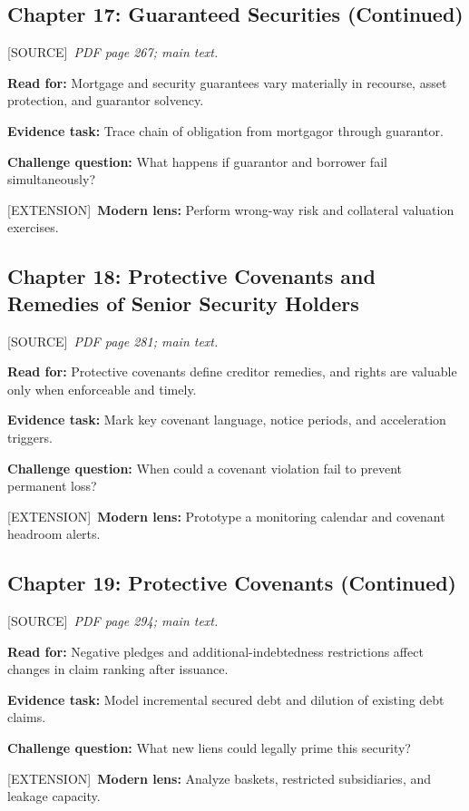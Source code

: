 \documentclass[11pt,letterpaper]{article}
\newcommand{\src}{\textsf{\color{sea}[SOURCE]}}
\newcommand{\ext}{\textsf{\color{gold}[EXTENSION]}}
\begin{document}
\subsection{Chapter 17: Guaranteed Securities (Continued)}
\src\ \textit{PDF page 267; main text.}\par
\textbf{Read for:} Mortgage and security guarantees vary materially in recourse, asset protection, and guarantor solvency.\par
\textbf{Evidence task:} Trace chain of obligation from mortgagor through guarantor.\par
\textbf{Challenge question:} What happens if guarantor and borrower fail simultaneously?\par
\ext\ \textbf{Modern lens:} Perform wrong-way risk and collateral valuation exercises.\par

\subsection{Chapter 18: Protective Covenants and Remedies of Senior Security Holders}
\src\ \textit{PDF page 281; main text.}\par
\textbf{Read for:} Protective covenants define creditor remedies, and rights are valuable only when enforceable and timely.\par
\textbf{Evidence task:} Mark key covenant language, notice periods, and acceleration triggers.\par
\textbf{Challenge question:} When could a covenant violation fail to prevent permanent loss?\par
\ext\ \textbf{Modern lens:} Prototype a monitoring calendar and covenant headroom alerts.\par

\subsection{Chapter 19: Protective Covenants (Continued)}
\src\ \textit{PDF page 294; main text.}\par
\textbf{Read for:} Negative pledges and additional-indebtedness restrictions affect changes in claim ranking after issuance.\par
\textbf{Evidence task:} Model incremental secured debt and dilution of existing debt claims.\par
\textbf{Challenge question:} What new liens could legally prime this security?\par
\ext\ \textbf{Modern lens:} Analyze baskets, restricted subsidiaries, and leakage capacity.\par
\end{document}
